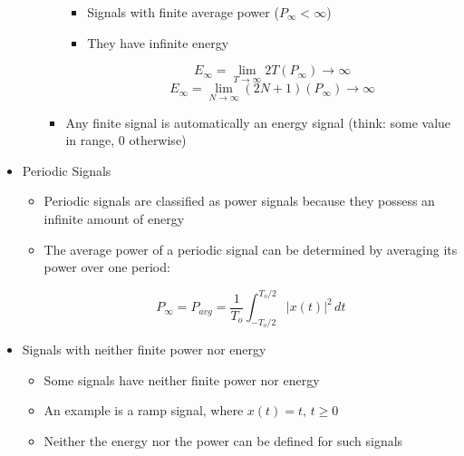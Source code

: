 \begin{itemize}
\begin{itemize}
\begin{itemize}
\begin{itemize}
              \item Signals with finite average power ($P_{\infty} < \infty$)

              \item They have infinite energy

                $$E_{\infty}=\lim_{T\to\infty}2T(P_{\infty})\to\infty$$
                $$E_{\infty}=\lim_{N\to\infty}(2N+1)(P_{\infty})\to\infty$$

            \end{itemize}

          \item Any finite signal is automatically an energy signal (think: some value in range, 0 otherwise)

        \end{itemize}

    \end{itemize}

  \item Periodic Signals

    \begin{itemize}

      \item Periodic signals are classified as power signals because they possess an infinite amount of energy

      \item The average power of a periodic signal can be determined by averaging its power over one period:

        $$P_{\infty}=P_{avg}=\frac{1}{T_o}\int_{-T_o/2}^{T_o/2}|x(t)|^2\,dt$$

    \end{itemize}

  \item Signals with neither finite power nor energy

    \begin{itemize}

      \item Some signals have neither finite power nor energy

      \item An example is a ramp signal, where $x(t)=t,\,t\geq 0$

      \item Neither the energy nor the power can be defined for such signals

    \end{itemize}

\end{itemize}



